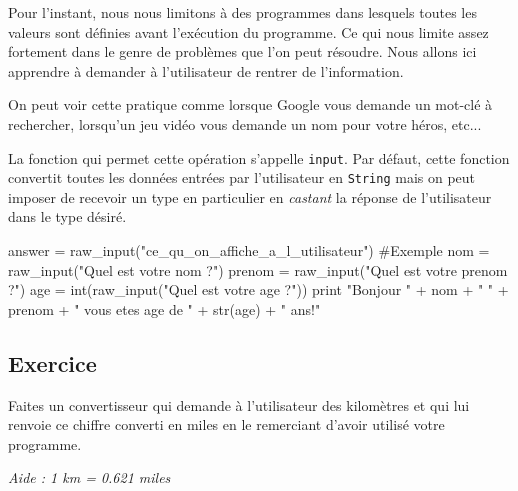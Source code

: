 Pour l'instant, nous nous limitons à des programmes dans lesquels toutes les valeurs sont définies avant l'exécution du programme. Ce qui nous limite assez fortement dans le genre de problèmes que l'on peut résoudre. Nous allons ici apprendre à demander à l'utilisateur de rentrer de l'information. 

On peut voir cette pratique comme lorsque Google vous demande un mot-clé à rechercher, lorsqu'un jeu vidéo vous demande un nom pour votre héros, etc...

La fonction qui permet cette opération s'appelle \texttt{input}. Par défaut, cette fonction convertit toutes les données entrées par l'utilisateur en \texttt{String} mais on peut imposer de recevoir un type en particulier en \textit{castant} la réponse de l'utilisateur dans le type désiré. 

\begin{python}[caption = fonction \texttt{input}]
answer = raw_input("ce_qu_on_affiche_a_l_utilisateur")
#Exemple
nom = raw_input("Quel est votre nom ?")
prenom = raw_input("Quel est votre prenom ?")
age = int(raw_input("Quel est votre age ?"))
print "Bonjour " + nom + " " + prenom + " vous etes age de " + str(age) + " ans!"
\end{python}


\subsection{Exercice} Faites un convertisseur qui demande à l'utilisateur des kilomètres et qui lui renvoie ce chiffre converti en miles en le remerciant d'avoir utilisé votre programme.

\textit{Aide : 1 km = 0.621 miles}
\label{convertisseur}
